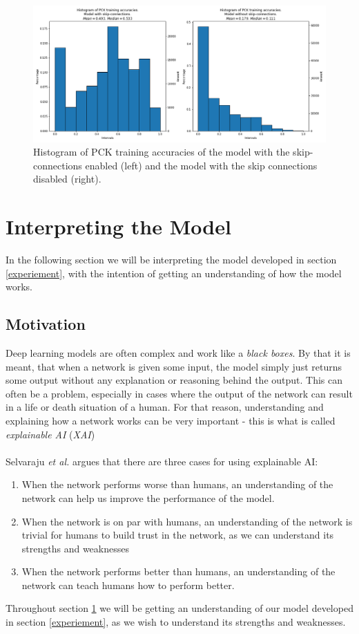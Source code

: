 \documentclass[./main.tex]{subfiles}
\begin{document}
\begin{figure}[htbp]
    \centering
    \includegraphics[height = 6 cm]{entities/PCK_accs_vs.png}
    \caption{Histogram of PCK training accuracies of the model with the skip-connections enabled (left) and the model with the skip connections disabled (right).}
    \label{fig:PCK_accs}
\end{figure}

\section{Interpreting the Model}\label{sec:XAI}
In the following section we will be interpreting the model developed in section \ref{experiement}, with the intention of getting an understanding of how the model works.

\subsection{Motivation}
Deep learning models are often complex and work like a \textit{black boxes}. By that it is meant, that when a network is given some input, the model simply just returns some output without any explanation or reasoning behind the output. This can often be a problem, especially in cases where the output of the network can result in a life or death situation of a human. For that reason, understanding and explaining how a network works can be very important - this is what is called \textit{explainable AI} (\textit{XAI}) 
\\
\\
Selvaraju \textit{et al.} \cite{Selvaraju} argues that there are three cases for using explainable AI:
\begin{enumerate}
    \item When the network performs worse than humans, an understanding of the network can help us improve the performance of the model.
    \item When the network is on par with humans, an understanding of the network is trivial for humans to build trust in the network, as we can understand its strengths and weaknesses
    \item When the network performs better than humans, an understanding of the network can teach humans how to perform better.
\end{enumerate}
Throughout section \ref{sec:XAI} we will be getting an understanding of our model developed in section \ref{experiement}, as we wish to understand its strengths and weaknesses.
\end{document}
